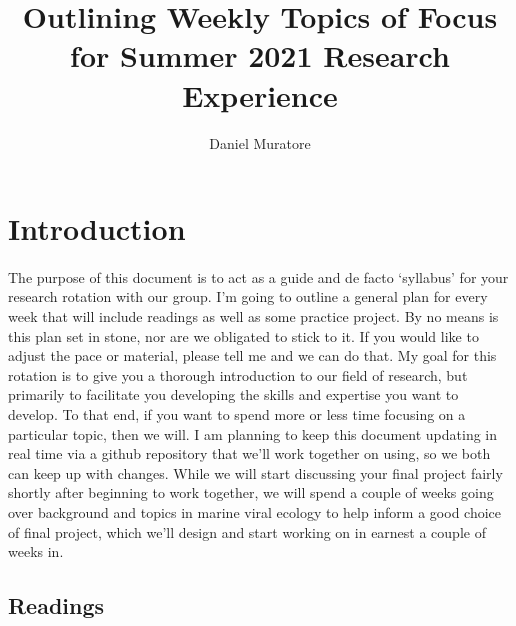 \documentclass[11pt]{amsart}
\title{Outlining Weekly Topics of Focus for Summer 2021 Research Experience}
\author{Daniel Muratore}
\begin{document}
\maketitle
\section{Introduction}
\paragraph{} The purpose of this document is to act as a guide and de facto `syllabus' for your research rotation with our group. I'm going to outline a general plan for every week that will include readings as well as some practice project. By no means is this plan set in stone, nor are we obligated to stick to it. If you would like to adjust the pace or material, please tell me and we can do that. My goal for this rotation is to give you a thorough introduction to our field of research, but primarily to facilitate you developing the skills and expertise you want to develop. To that end, if you want to spend more or less time focusing on a particular topic, then we will. I am planning to keep this document updating in real time via a github repository that we'll work together on using, so we both can keep up with changes. While we will start discussing your final project fairly shortly after beginning to work together, we will spend a couple of weeks going over background and topics in marine viral ecology to help inform a good choice of final project, which we'll design and start working on in earnest a couple of weeks in. 
\subsection{Readings}
\end{document}
